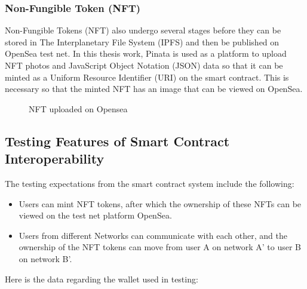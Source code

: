 \subsubsection{Non-Fungible Token (NFT)}
Non-Fungible Tokens (NFT) also undergo several stages before they can be stored in The Interplanetary File System (IPFS) and then be published on OpenSea test net. In this thesis work, Pinata is used as a platform to upload NFT photos and JavaScript Object Notation (JSON) data so that it can be minted as a Uniform Resource Identifier (URI) on the smart contract. This is necessary so that the minted NFT has an image that can be viewed on OpenSea.

\begin{figure} [H] \centering
  \caption{NFT uploaded on Opensea}
  \label{fig:opensea}
\end{figure}

\subsection{Testing Features of Smart Contract Interoperability}
The testing expectations from the smart contract system include the following:
\begin{itemize}
    \item Users can mint NFT tokens, after which the ownership of these NFTs can be viewed on the test net platform OpenSea.

    \item Users from different Networks can communicate with each other, and the ownership of the NFT tokens can move from user A on network A' to user B on network B'.
\end{itemize}

Here is the data regarding the wallet used in testing:

